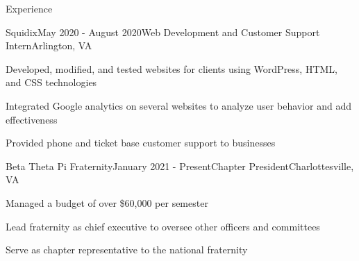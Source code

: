 \documentclass{resume}
\begin{document}
\begin{rSection}{Experience}

    \begin{rSubsection}{Squidix}{May 2020 - August 2020}{Web Development and Customer Support Intern}{Arlington, VA}
        \item Developed, modified, and tested websites for clients using WordPress, HTML, and CSS technologies
        \item Integrated Google analytics on several websites to analyze user behavior and add effectiveness
        \item Provided phone and ticket base customer support to businesses
    \end{rSubsection}



    \begin{rSubsection}{Beta Theta Pi Fraternity}{January 2021 - Present}{Chapter President}{Charlottesville, VA}
        \item Managed a budget of over \$60,000 per semester
        \item Lead fraternity as chief executive to oversee other officers and committees
        \item Serve as chapter representative to the national fraternity
    \end{rSubsection}


\end{rSection}

\end{document}
